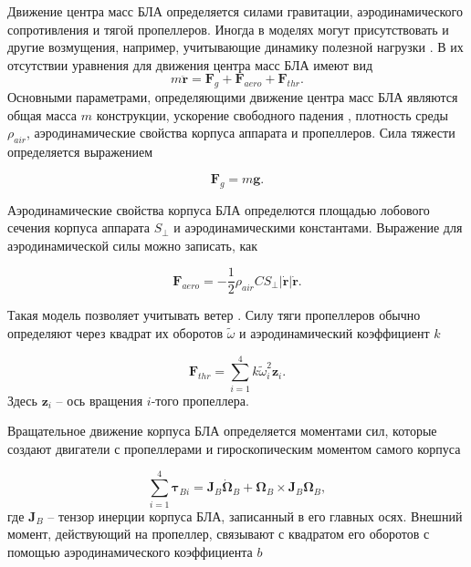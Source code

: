 Движение центра масс БЛА определяется силами гравитации, аэродинамического сопротивления и тягой пропеллеров.
Иногда в моделях могут присутствовать и другие возмущения, например, учитывающие динамику полезной нагрузки \cite{Lim01}.
В их отсутствии уравнения для движения центра масс БЛА имеют вид
\begin{equation} \label{eq:common_traslational_motion}
m \ddot{\bm{r}} = \bm{F}_g + \bm{F}_{aero} + \bm{F}_{thr}.
\end{equation}
Основными параметрами, определяющими движение центра масс БЛА являются общая масса {$m$} конструкции, ускорение свободного падения , плотность среды {$\rho_{air}$}, аэродинамические свойства корпуса аппарата и пропеллеров. Сила тяжести определяется выражением

\begin{equation} \label{eq:gravity_force}
\bm{F}_g = m\bm{g}.
\end{equation}

Аэродинамические свойства корпуса БЛА определются площадью лобового сечения корпуса аппарата {$S_{\perp}$} и аэродинамическими константами. Выражение для аэродинамической силы можно записать, как \cite{Biard01}

\begin{equation} \label{eq:aerodynamic_force}
\bm{F}_{aero} = - \frac{1}{2} \rho_{air} C S_{\perp} |\dot{\bm{r}}| \dot{\bm{r}}.
\end{equation}

Такая модель позволяет учитывать ветер \cite{Bannwarth01}.
Силу тяги пропеллеров обычно определяют через квадрат их оборотов $\tilde\omega$ и аэродинамический коэффициент $k$ \cite{Falconi01}

\begin{equation} \label{eq:thrust_force}
\bm{F}_{thr} = \sum_{i=1}^{4}{ { k \tilde\omega^2_i \bm{z}_i}.}
\end{equation}
Здесь $\bm{z}_i$ -- ось вращения $i$-того пропеллера.
 
Вращательное движение корпуса БЛА определяется моментами сил, которые создают двигатели с пропеллерами и гироскопическим моментом самого корпуса

\begin{equation} \label{eq:common_rotational_motion}
\sum_{i=1}^{4}{\bm{\tau}_{Bi}} = \bm{J}_B\dot{\bm{\Omega}}_B + \bm{\Omega}_B \times  \bm{J}_B{\bm{\Omega}_B},
\end{equation}
где $\bm{J}_B$ -- тензор инерции корпуса БЛА, записанный в его главных осях.
Внешний момент, действующий на пропеллер, связывают с квадратом его оборотов с помощью аэродинамического коэффициента $b$ \cite{Ryll01}

